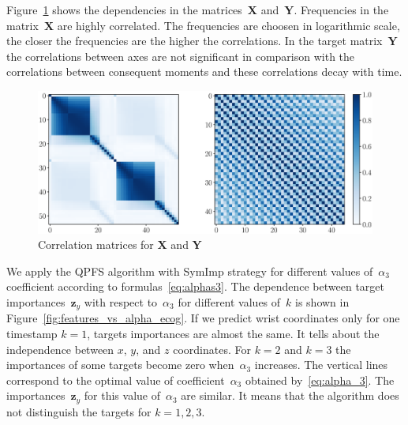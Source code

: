 \documentclass[12pt,oneside]{article}
\theoremstyle{definition}
\newcommand{\bz}{\mathbf{z}}
\newcommand{\bY}{\mathbf{Y}}
\newcommand{\bX}{\mathbf{X}}
\begin{document}
Figure~\ref{fig:corr_matrix} shows the dependencies in the matrices~$\bX$ and~$\bY$. Frequencies in the matrix~$\bX$ are highly correlated. 
The frequencies are choosen in logarithmic scale, the closer the frequencies are the higher the correlations.
In the target matrix~$\bY$ the correlations between axes are not significant in comparison with the correlations between consequent moments and these correlations decay with time.
\begin{figure}[h]
	\includegraphics[width=\linewidth]{figs/corr_matrix.eps}
	\caption{Correlation matrices for $\bX$ and $\bY$}
	\label{fig:corr_matrix}
\end{figure}

We apply the QPFS algorithm with SymImp strategy for different values of~$\alpha_3$ coefficient according to formulas~\eqref{eq:alphas3}.
The dependence between target importances~$\bz_y$ with respect to~$\alpha_3$ for different values of~$k$ is shown in Figure~\ref{fig:features_vs_alpha_ecog}.
If we predict wrist coordinates only for one timestamp $k = 1$, targets importances are almost the same.
It tells about the independence between $x$, $y$, and $z$ coordinates.
For $k = 2$ and $k = 3$ the importances of some targets become zero when~$\alpha_3$ increases.
The vertical lines correspond to the optimal value of coefficient~$\alpha_3$ obtained by~\eqref{eq:alpha_3}. 
The importances~$\bz_y$ for this value of~$\alpha_3$ are similar. 
It means that the algorithm does not distinguish the targets for $k=1, 2, 3$.
\end{document}
